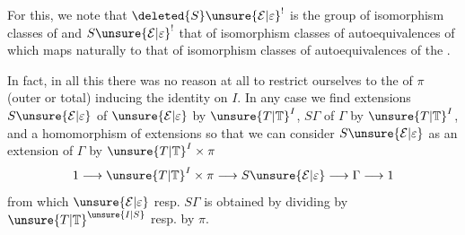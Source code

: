 For this, we note that $\deleted{S}\unsure{\mathcal E|\varepsilon}^{!}$ is the group of isomorphism classes  of
and $S\unsure{\mathcal E|\varepsilon}^{!}$ that of isomorphism classes of  autoequivalences of
which maps naturally to that of isomorphism classes of autoequivalences of the 
.


In fact, in all this there was no reason at all to restrict ourselves to the   of $\pi$ (outer or total) inducing the identity on $I$. In any case we find extensions $S\unsure{\mathcal E|\varepsilon}$ of $\unsure{\mathcal E|\varepsilon}$ by $\unsure{T|\mathbb T}^I$, $S\Gamma$ of $\Gamma$ by $\unsure{T|\mathbb T}^I$, and a homomorphism of extensions
so that we can consider $S\unsure{\mathcal E|\varepsilon}$ as an extension of $\Gamma$ by $\unsure{T|\mathbb T}^I\times\pi$
\[
1\longrightarrow \unsure{T|\mathbb T}^I\times\pi\longrightarrow S\unsure{\mathcal E|\varepsilon}\longrightarrow\Gamma\longrightarrow1
\]
from which  $\unsure{\mathcal E|\varepsilon}$ resp. $S\Gamma$ is obtained by dividing by $\unsure{T|\mathbb T}^{\unsure{I|S}}$ resp. by $\pi$.

